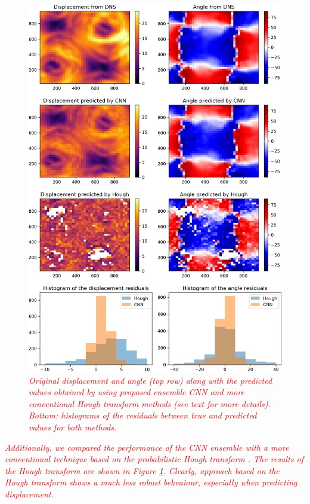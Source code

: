 \documentclass{svjour3}                     %
\newcommand{\new}[1]{\textit{\textcolor{red}{#1}}}
\begin{document}
\begin{figure}
\includegraphics[width=\textwidth]{figs/figure6.png}
\caption{\new{Original displacement and angle (top row) along with the  predicted values obtained by using proposed ensemble CNN and more conventional Hough transform methods (see text for more details). Bottom: histograms of the residuals between true and predicted values for both methods.}}
\label{fig:fig7}
\end{figure}

\new{Additionally, we compared the performance of the CNN ensemble with a more conventional technique based on the probabilistic Hough transform \cite{galamhos1999}. The results of the Hough transform are shown in Figure \ref{fig:fig7}. Clearly, approach based on the Hough transform shows a much less robust behvaiour, especially when predicting displacement.}
\end{document}
